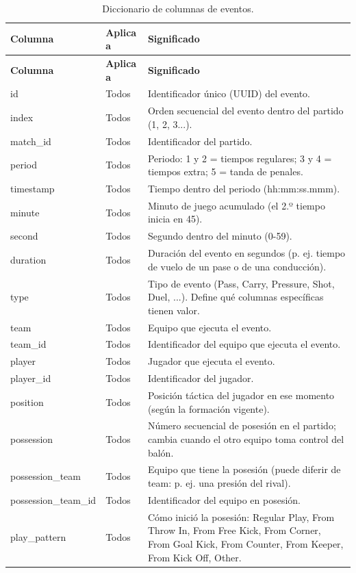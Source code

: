{\scriptsize
\begin{longtable}{p{4.3cm}p{2.2cm}p{8.8cm}}
\caption{Diccionario de columnas de eventos.}\label{tab:dic_eventos}\\
\toprule
\textbf{Columna} & \textbf{Aplica a} & \textbf{Significado} \\
\midrule
\endfirsthead
\toprule
\textbf{Columna} & \textbf{Aplica a} & \textbf{Significado} \\
\midrule
\endhead
\bottomrule
\endfoot
id & Todos & Identificador único (UUID) del evento. \\
index & Todos & Orden secuencial del evento dentro del partido (1, 2, 3...). \\
match\_id & Todos & Identificador del partido. \\
period & Todos & Periodo: 1 y 2 = tiempos regulares; 3 y 4 = tiempos extra; 5 = tanda de penales. \\
timestamp & Todos & Tiempo dentro del periodo (hh:mm:ss.mmm). \\
minute & Todos & Minuto de juego acumulado (el 2.º tiempo inicia en 45). \\
second & Todos & Segundo dentro del minuto (0-59). \\
duration & Todos & Duración del evento en segundos (p. ej. tiempo de vuelo de un pase o de una conducción). \\
type & Todos & Tipo de evento (Pass, Carry, Pressure, Shot, Duel, ...). Define qué columnas específicas tienen valor. \\
team & Todos & Equipo que ejecuta el evento. \\
team\_id & Todos & Identificador del equipo que ejecuta el evento. \\
player & Todos & Jugador que ejecuta el evento. \\
player\_id & Todos & Identificador del jugador. \\
position & Todos & Posición táctica del jugador en ese momento (según la formación vigente). \\
possession & Todos & Número secuencial de posesión en el partido; cambia cuando el otro equipo toma control del balón. \\
possession\_team & Todos & Equipo que tiene la posesión (puede diferir de team: p. ej. una presión del rival). \\
possession\_team\_id & Todos & Identificador del equipo en posesión. \\
play\_pattern & Todos & Cómo inició la posesión: Regular Play, From Throw In, From Free Kick, From Corner, From Goal Kick, From Counter, From Keeper, From Kick Off, Other. \\

\end{longtable}}
